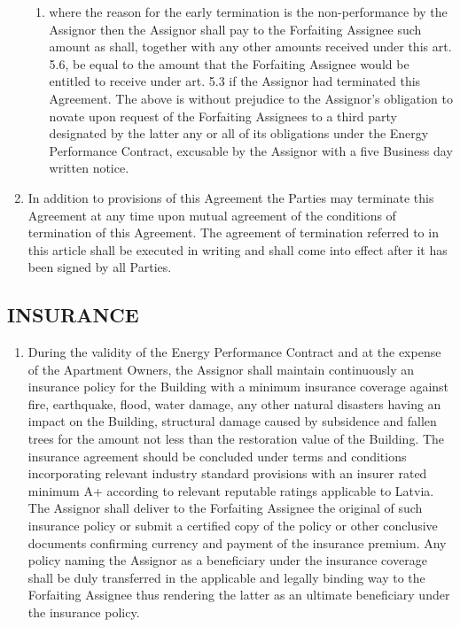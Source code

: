 \documentclass[a4paper]{article}
\begin{document}
\begin{multicols}{2}
\begin{enumerate}
\begin{enumerate}
    \item{where the reason for the early termination is the
        non{-}performance by the Assignor then the Assignor shall pay
        to the Forfaiting Assignee such amount as shall, together with
        any other amounts received under this art. 5.6, be equal to
        the amount that the Forfaiting Assignee would be entitled to
        receive under art. 5.3 if the Assignor had terminated this
        Agreement. The above is without prejudice to the Assignor’s
        obligation to novate upon request of the Forfaiting Assignees
        to a third party designated by the latter any or all of its
        obligations under the Energy Performance Contract, excusable
        by the Assignor with a five Business day written notice.}
    \end{enumerate}

  \item{In addition to provisions of this Agreement the Parties may
      terminate this Agreement at any time upon mutual agreement of
      the conditions of termination of this Agreement. The agreement
      of termination referred to in this article shall be executed in
      writing and shall come into effect after it has been signed by
      all Parties.}
  \end{enumerate}

  \subsection{INSURANCE}

  \begin{enumerate}
  \item{During the validity of the Energy Performance Contract and at
      the expense of the Apartment Owners, the Assignor shall maintain
      continuously an insurance policy for the Building with a minimum
      insurance coverage against fire, earthquake, flood, water
      damage, any other natural disasters having an impact on the
      Building, structural damage caused by subsidence and fallen
      trees for the amount not less than the restoration value of the
      Building. The insurance agreement should be concluded under
      terms and conditions incorporating relevant industry standard
      provisions with an insurer rated minimum A+ according to
      relevant reputable ratings applicable to Latvia. The Assignor
      shall deliver to the Forfaiting Assignee the original of such
      insurance policy or submit a certified copy of the policy or
      other conclusive documents confirming currency and payment of
      the insurance premium. Any policy naming the Assignor as a
      beneficiary under the insurance coverage shall be duly
      transferred in the applicable and legally binding way to the
      Forfaiting Assignee thus rendering the latter as an ultimate
      beneficiary under the insurance policy.}


\end{enumerate}
\end{multicols}
\end{document}
